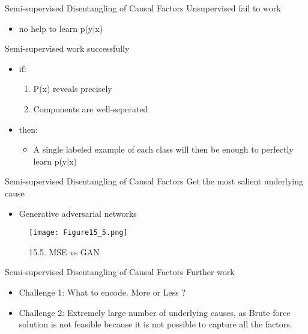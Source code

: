 \begin{frame}{Semi-supervised Disentangling of Causal Factors}
Unsupervised fail to work
\begin{itemize}
  \item no help to learn p(y|x)
\end{itemize}
Semi-supervised work successfully
\begin{itemize}
  \item if:
   \begin{enumerate} %
   \item P(x) reveals precisely
   \item Components are well-seperated
   \end{enumerate}
  \item then:
  \begin{itemize}
  \item A single labeled example of each class will then be enough to perfectly learn p(y|x)
\end{itemize}
\end{itemize}
\end{frame}

\begin{frame}{Semi-supervised Disentangling of Causal Factors}
Get the most salient underlying cause
\begin{itemize}
  \item Generative adversarial networks
\end{itemize}
\begin{figure}[t]
\centering
\texttt{[image: Figure15\_5.png]} %
\caption{15.5. MSE vs GAN}
\end{figure}
\end{frame}

\begin{frame}{Semi-supervised Disentangling of Causal Factors}
Further work
\begin{itemize}
  \item Challenge 1: What to encode. More or Less ?
  \item Challenge 2: Extremely large number of underlying causes, as Brute force solution is not feasible because it is not possible to capture all the factors.
\end{itemize}
\end{frame}


